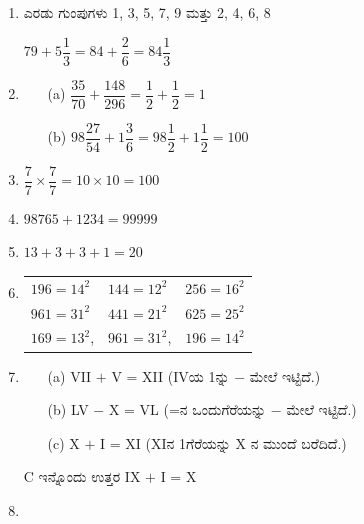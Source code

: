 \begin{enumerate}
\itemsep=5pt

\item ಎರಡು ಗುಂಪುಗಳು 1, 3, 5, 7, 9 ಮತ್ತು 2, 4, 6, 8

$79 + 5\dfrac{1}{3} = 84 + \dfrac{2}{6} = 84\dfrac{1}{3}$

\item 
\begin{itemize}
\item[(a)] $\dfrac{35}{70} + \dfrac{148}{296} = \dfrac{1}{2} + \dfrac{1}{2} = 1$

\medskip

\item[(b)] $98 \dfrac{27}{54} + 1\dfrac{3}{6} = 98\dfrac{1}{2} + 1\dfrac{1}{2} = 100$
\end{itemize}

\item $\dfrac{7}{7}\times \dfrac{7}{7} = 10\times 10 = 100$

\smallskip
\item $98765 + 1234 = 99999$

\item $13 + 3 + 3 + 1 = 20$

\item 

\begin{tabular}[t]{lll}
$196 = 14^{2}$ & $144 = 12^{2}$ & $256 = 16^{2}$\\
$961 = 31^{2}$ & $441 = 21^{2}$ & $625 = 25^{2}$\\
$169 = 13^{2}$, & $961 = 31^{2}$, & $196 = 14^{2}$
\end{tabular}

\item 
\begin{itemize}
\item[(a)] VII $+$ V = XII (IVಯ 1ನ್ನು $-$ ಮೇಲೆ ಇಟ್ಟಿದೆ.)
\item[(b)] LV $-$ X = VL (=ನ ಒಂದುಗೆರೆಯನ್ನು $-$ ಮೇಲೆ ಇಟ್ಟಿದೆ.)
\item[(c)] X $+$ I = XI (XIನ 1ಗೆರೆಯನ್ನು X ನ ಮುಂದೆ ಬರೆದಿದೆ.)
\end{itemize}

C ಇನ್ನೊಂದು ಉತ್ತರ IX $+$ I = X

\item 
~


\end{enumerate}
